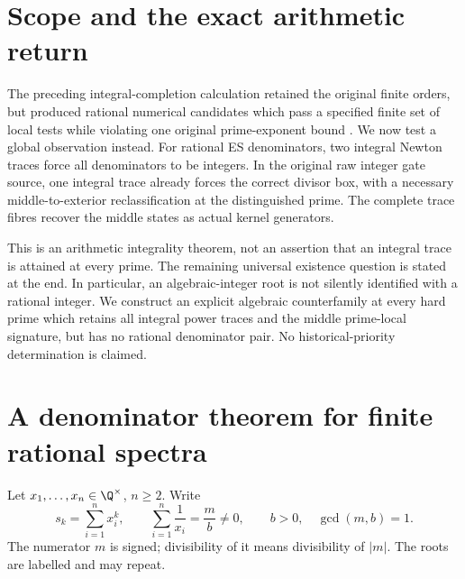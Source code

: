 \section{Scope and the exact arithmetic return}
The preceding integral-completion calculation retained the original finite
orders, but produced rational numerical candidates which pass a specified finite
set of local tests while violating one original prime-exponent bound
\cite[\S\,``One unavailable prime occurrence'']{Previous}. We now test a global
observation instead. For rational ES denominators, two integral Newton traces
force all denominators to be integers. In the original raw integer gate source,
one integral trace already forces the correct divisor box, with a necessary
middle-to-exterior reclassification at the distinguished prime. The complete
trace fibres recover the middle states as actual kernel generators.

This is an arithmetic integrality theorem, not an assertion that an integral
trace is attained at every prime. The remaining universal existence question is
stated at the end. In particular, an algebraic-integer root is not silently
identified with a rational integer. We construct an explicit algebraic
counterfamily at every hard prime which retains all integral power traces and
the middle prime-local signature, but has no rational denominator pair.
No historical-priority determination is claimed.

\section{A denominator theorem for finite rational spectra}
Let $x_1,\ldots,x_n\in\Q^\times$, $n\ge2$. Write
\[
 s_k=\sum_{i=1}^n x_i^k,\qquad
 \sum_{i=1}^n\frac1{x_i}=\frac{m}{b}\ne0,
 \qquad b>0,\quad\gcd(m,b)=1.
\]
The numerator $m$ is signed; divisibility of it means divisibility of $|m|$.
The roots are labelled and may repeat.

